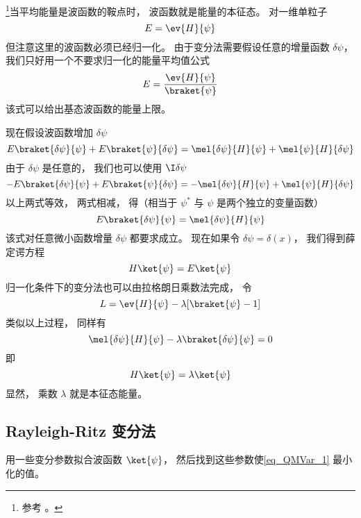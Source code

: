 

\footnote{参考 \cite{Bransden}。}当平均能量是波函数的鞍点时， 波函数就是能量的本征态。 对一维单粒子
\begin{equation}
E = \ev{H}{\psi}
\end{equation}
但注意这里的波函数必须已经归一化。 由于变分法需要假设任意的增量函数 $\delta \psi $，  我们只好用一个不要求归一化的能量平均值公式
\begin{equation}\label{eq_QMVar_1}
E = \frac{\ev{H}{\psi}}{\braket{\psi}}
\end{equation}
该式可以给出基态波函数的能量上限。

现在假设波函数增加 $\delta \psi$ 
\begin{equation}
E \braket{\delta\psi}{\psi} + E\braket{\psi}{\delta\psi}
= \mel{\delta \psi}{H}{\psi} + \mel{\psi}{H}{\delta\psi}
\end{equation}
由于 $\delta\psi$ 是任意的， 我们也可以使用 $\I\delta\psi$ 
\begin{equation}
-E \braket{\delta\psi}{\psi} + E \braket{\psi}{\delta\psi}
= -\mel{\delta\psi}{H}{\psi} + \mel{\psi}{H}{\delta\psi}
\end{equation}
以上两式等效， 两式相减， 得（相当于 $\psi^*$ 与 $\psi$ 是两个独立的变量函数）
\begin{equation}
E\braket{\delta\psi}{\psi} = \mel{\delta\psi}{H}{\psi}
\end{equation}
该式对任意微小函数增量 $\delta\psi $ 都要求成立。 现在如果令 $\delta \psi  = \delta (x)$，  我们得到薛定谔方程
\begin{equation}
H \ket{\psi} = E\ket{\psi}
\end{equation}
归一化条件下的变分法也可以由拉格朗日乘数法完成， 令
\begin{equation}
L = \ev{H}{\psi} - \lambda [\braket{\psi} - 1]
\end{equation}
类似以上过程， 同样有
\begin{equation}
\mel{\delta\psi}{H}{\psi} - \lambda\braket{\delta\psi}{\psi} = 0
\end{equation}
即
\begin{equation}
H \ket{\psi} = \lambda \ket{\psi}
\end{equation}
显然， 乘数 $\lambda $ 就是本征态能量。

\subsection{Rayleigh-Ritz 变分法}
用一些变分参数拟合波函数 $\ket{\psi}$， 然后找到这些参数使\autoref{eq_QMVar_1} 最小化的值。

